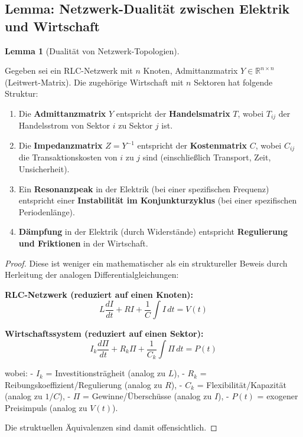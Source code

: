 \documentclass[a4paper,12pt]{article}
\theoremstyle{definition}
\newtheorem{lemma}{Lemma}
\begin{document}
\subsection{Lemma: Netzwerk-Dualität zwischen Elektrik und Wirtschaft}

\begin{lemma}[Dualität von Netzwerk-Topologien]
\label{lem:netzwerk_dualität}

Gegeben sei ein RLC-Netzwerk mit $n$ Knoten, Admittanzmatrix $Y \in \mathbb{R}^{n \times n}$ (Leitwert-Matrix). Die zugehörige Wirtschaft mit $n$ Sektoren hat folgende Struktur:

\begin{enumerate}
\item Die \textbf{Admittanzmatrix} $Y$ entspricht der \textbf{Handelsmatrix} $T$, wobei $T_{ij}$ der Handelsstrom von Sektor $i$ zu Sektor $j$ ist.

\item Die \textbf{Impedanzmatrix} $Z = Y^{-1}$ entspricht der \textbf{Kostenmatrix} $C$, wobei $C_{ij}$ die Transaktionskosten von $i$ zu $j$ sind (einschließlich Transport, Zeit, Unsicherheit).

\item Ein \textbf{Resonanzpeak} in der Elektrik (bei einer spezifischen Frequenz) entspricht einer \textbf{Instabilität im Konjunkturzyklus} (bei einer spezifischen Periodenlänge).

\item \textbf{Dämpfung} in der Elektrik (durch Widerstände) entspricht \textbf{Regulierung und Friktionen} in der Wirtschaft.
\end{enumerate}

\end{lemma}

\begin{proof}

Diese ist weniger ein mathematischer als ein struktureller Beweis durch Herleitung der analogen Differentialgleichungen:

\textbf{RLC-Netzwerk (reduziert auf einen Knoten):}
\[
L \frac{dI}{dt} + R I + \frac{1}{C} \int I \, dt = V(t)
\]

\textbf{Wirtschaftssystem (reduziert auf einen Sektor):}
\[
I_k \frac{d\Pi}{dt} + R_k \Pi + \frac{1}{C_k} \int \Pi \, dt = P(t)
\]

wobei:
- $I_k$ = Investitionsträgheit (analog zu $L$),
- $R_k$ = Reibungskoeffizient/Regulierung (analog zu $R$),
- $C_k$ = Flexibilität/Kapazität (analog zu $1/C$),
- $\Pi$ = Gewinne/Überschüsse (analog zu $I$),
- $P(t)$ = exogener Preisimpuls (analog zu $V(t)$).

Die struktuellen Äquivalenzen sind damit offensichtlich.

\end{proof}
\end{document}

